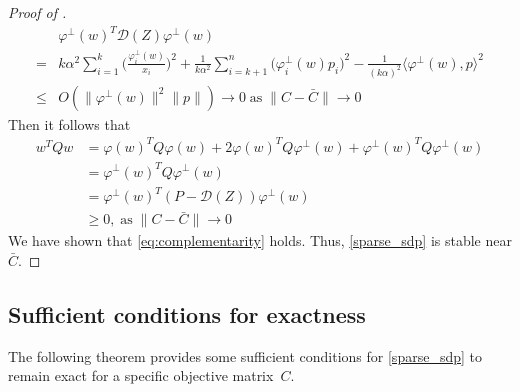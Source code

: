 \documentclass[11pt]{amsart}
\theoremstyle{plain}
\theoremstyle{definition}
\theoremstyle{remark}
\newcommand{\cD}{{\mathcal{D}}}
\begin{document}
\begin{proof}[Proof of ]
		\begin{equation}\label{eq:stable_D}
			\begin{split}
				&\varphi^\perp(w)^T \cD(Z) \varphi^\perp(w) \\
				=& k\alpha^2\sum_{i=1}^k \big(\tfrac{\varphi_i^\perp(w)}{ x_i}\big)^2 + \frac{1}{k\alpha^2}\sum_{i=k+1}^n \big(\varphi_i^\perp(w) p_i\big)^2  -  \frac{1}{(k\alpha)^2}\langle\varphi^\perp(w), p\rangle^2\\
				\leq& O(\|\varphi^\perp(w)\|^2\|p\|) \rightarrow 0\; \text{as}\;\|C - \bar C\|\rightarrow 0
			\end{split}
		\end{equation}
		Then it follows that
		\begin{equation}
			\begin{split}
				w^T Q w
				&= \varphi(w)^T Q \varphi(w) + 2 \varphi(w)^T Q \varphi^\perp(w) + \varphi^\perp(w)^T Q \varphi^\perp(w)\\
				&= \varphi^\perp(w)^T Q \varphi^\perp(w)\\
				&= \varphi^\perp(w)^T (P -\cD(Z)) \varphi^\perp(w) \\
				&\geq 0, \; \text{as}\;\|C - \bar C\|\rightarrow 0
			\end{split}
		\end{equation}
		We have shown that \eqref{eq:complementarity} holds. Thus, \eqref{sparse_sdp} is stable near \(\bar C\).
	\end{proof}
	
	\subsection{Sufficient conditions for exactness}
	
	The following theorem provides some sufficient conditions for \eqref{sparse_sdp} to remain exact for a specific objective  matrix~$C$. 
	
\end{document}
